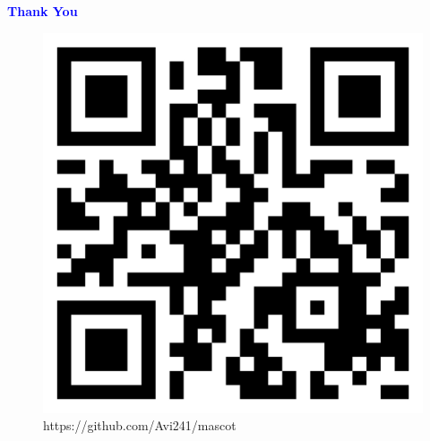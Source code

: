 \documentclass[10pt]{beamer}
\begin{document}
\begin{frame}{}
	\vspace*{1.5 cm}
	\Huge{\centerline{\textcolor{blue}{\textbf{Thank You}}}}
	\vspace*{0.8 cm}
	\begin{figure}[h!]
		\centering
		\includegraphics[scale=0.13]{qrcode.png}
		\caption{https://github.com/Avi241/mascot}
		\label{Fig:github}
	\end{figure}

\end{frame}

\end{document}
